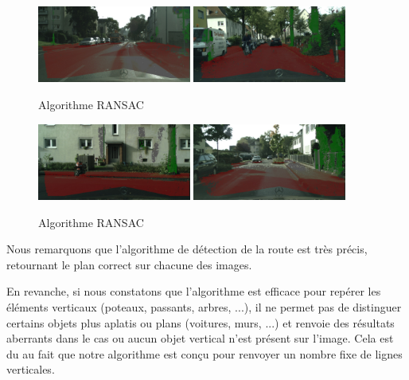 \documentclass[titlepage,11pt,a4paper]{article}
\begin{document}
\begin{figure}[H]
  \centering
    \includegraphics[width=0.45\textwidth]{images/result_ransac/result_6.jpg}
  \hfill{}
    \includegraphics[width=0.45\textwidth]{images/result_ransac/result_7.jpg}
  \hfill 
  \caption{Algorithme RANSAC}
\end{figure} 
\begin{figure}[H]
  \centering
    \includegraphics[width=0.45\textwidth]{images/result_ransac/result_8.jpg}
  \hfill{}
    \includegraphics[width=0.45\textwidth]{images/result_ransac/result_9.jpg}
  \hfill 
  \caption{Algorithme RANSAC}
\end{figure}

\par Nous remarquons que l'algorithme de détection de la route est très précis, retournant le plan correct sur chacune des images.
\par En revanche, si nous constatons que l'algorithme est efficace pour repérer les éléments verticaux (poteaux, passants, arbres, ...), il ne permet pas de distinguer certains objets plus aplatis ou plans (voitures, murs, ...) et renvoie des résultats aberrants dans le cas ou aucun objet vertical n'est présent sur l'image.
Cela est du au fait que notre algorithme est conçu pour renvoyer un nombre fixe de lignes verticales.
\end{document}
